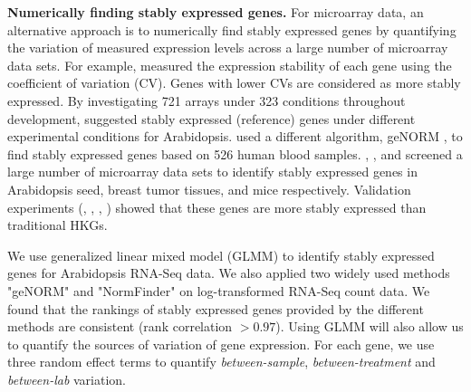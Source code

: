 \documentclass[11pt, a4paper]{article}
\begin{document}

\textbf{Numerically finding stably expressed genes.}
For microarray data, an alternative approach is to numerically find stably
expressed genes by quantifying the variation of measured expression levels
across a large number of microarray data sets. 
For example,  \cite{czechowski2005genome}
measured the expression stability of each gene using the coefficient of
variation (CV). Genes with lower CVs are considered as more stably expressed.
By investigating 721 arrays under 323 conditions throughout development,
\cite{czechowski2005genome} suggested stably expressed (reference) genes under
different experimental conditions for Arabidopsis.
\cite{stamova2009identification} used a different algorithm, geNORM
\citep{vandesompele2002accurate}, to find stably expressed genes based on 526
human blood samples. 
 \citet{dekkers2012identification}, \citet{gur2009identification}, and
 \citet{frericks2008toolbox} screened a large number of microarray data sets
 to identify stably expressed genes in Arabidopsis seed, breast tumor tissues,
 and mice respectively.
Validation experiments (\cite{czechowski2005genome},
\cite{dekkers2012identification}, \cite{huggett2005real},
\cite{stamova2009identification}) showed that these genes are more stably
expressed than traditional HKGs.  




We
use generalized linear mixed model (GLMM) \citep{mccullagh1989generalized} to
identify stably expressed genes for Arabidopsis RNA-Seq data. 
We also applied two widely used methods "geNORM"
\citep{vandesompele2002accurate} and  "NormFinder"
\citep{andersen2004normalization} on log-transformed RNA-Seq count data.
We found that the rankings of stably expressed genes provided by the different
methods are consistent (rank correlation $> 0.97$).  Using GLMM will also
allow us to quantify the sources of variation of gene expression. For each
gene, we use three random effect terms to quantify \textit{between-sample},
\textit{between-treatment} and \textit{between-lab} variation. 
\end{document}
